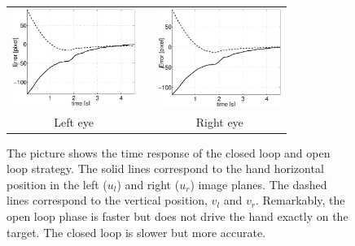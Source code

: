   \begin{figure}
  \begin{center}
	\begin{tabular}{ccc}
	  \parbox{50mm}{\includegraphics[width=40mm]{Figure/LeftEyeOpenClosedLoopTimeResponse.eps}}  & \hspace{2cm} &
	  \parbox{50mm}{\includegraphics[width=40mm]{Figure/RightEyeOpenClosedLoopTimeResponse.eps}}
	  \\
	  \parbox{50mm}{\centering Left eye } & \hspace{2cm} & \parbox{50mm}{\centering Right eye }
  \end{tabular}
\end{center}
\caption{The picture shows the time response of the closed loop and open loop strategy. The solid lines correspond to the hand horizontal position in the left ($u_l$) and right ($u_r$) image planes. The dashed lines correspond to the vertical position, $v_l$ and $v_r$. Remarkably, the open loop phase is faster but does not drive the hand exactly on the target. The closed loop is slower but more accurate.}\label{Fig:TimeResponseOpenClosedLoop}
  \end{figure}
  
